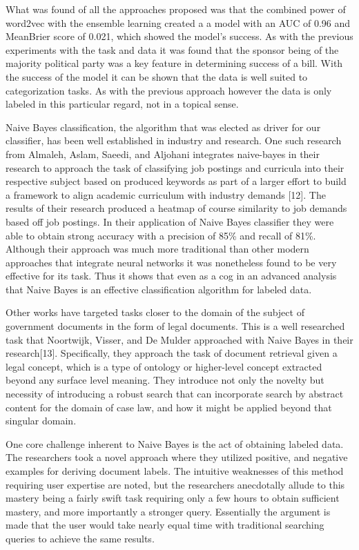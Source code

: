 \documentclass[11pt,a4paper]{article}
\begin{document}
What was found of all the approaches proposed was that the combined power of word2vec with the ensemble learning created a a model with an AUC of 0.96 and MeanBrier score of 0.021, which showed the model's success. As with the previous experiments with the task and data it was found that the sponsor being of the majority political party was a key feature in determining success of a bill. With the success of the model it can be shown that the data is well suited to categorization tasks. As with the previous approach however the data is only labeled in this particular regard, not in a topical sense.

Naive Bayes classification, the algorithm that was elected as driver for our classifier, has been well established in industry and research. One such research from Almaleh, Aslam, Saeedi, and Aljohani integrates naive-bayes in their research to approach the task of classifying job postings and curricula into their respective subject based on produced keywords as part of a larger effort to build a framework to align academic curriculum with industry demands [12]. The results of their research produced a heatmap of course similarity to job demands based off job postings. In their application of Naive Bayes classifier they were able to obtain strong accuracy with a precision of 85\% and recall of 81\%. Although their approach was much more traditional than other modern approaches that integrate neural networks it was nonetheless found to be very effective for its task. Thus it shows that even as a cog in an advanced analysis that Naive Bayes is an effective classification algorithm for labeled data.

Other works have targeted tasks closer to the domain of the subject of government documents in the form of legal documents. This is a well researched task that  Noortwijk, Visser, and De Mulder approached with Naive Bayes in their research[13]. Specifically, they approach the task of document retrieval given a legal concept, which is a type of ontology or higher-level concept extracted beyond any surface level meaning. They introduce not only the novelty but necessity of introducing a robust search that can incorporate search by abstract content for the domain of case law, and how it might be applied beyond that singular domain.

One core challenge inherent to Naive Bayes is the act of obtaining labeled data. The researchers took a novel approach where they utilized positive, and negative examples for deriving document labels. The intuitive weaknesses of this method requiring user expertise are noted, but the researchers anecdotally allude to this mastery being a fairly swift task requiring only a few hours to obtain sufficient mastery, and more importantly a stronger query. Essentially the argument is made that the user would take nearly equal time with traditional searching queries to achieve the same results.
\end{document}
